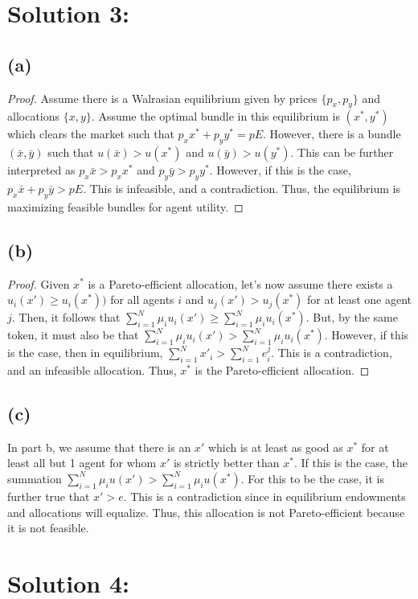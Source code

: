 \documentclass[10pt,a4paper]{article}
\begin{document}
\section*{Solution 3:}
  \subsection*{(a)}
    \begin{proof}
      Assume there is a Walrasian equilibrium given by prices $\{p_x,p_y\}$ and allocations $\{x,y\}$. Assume the optimal bundle in this equilibrium is $(x^*,y^*)$ which clears the market such that $p_xx^* + p_yy^* = pE$. However, there is a bundle $(\bar{x},\bar{y})$ such that $u(\bar{x})>u(x^*)$ and $u(\bar{y}) > u(y^*)$. This can be further interpreted as $p_x\bar{x} > p_xx^*$ and $p_y\bar{y} > p_yy^*$. However, if this is the case, $p_x\bar{x}+p_y\bar{y}>pE$. This is infeasible, and a contradiction. Thus, the equilibrium is maximizing feasible bundles for agent utility. 
    \end{proof}
  \subsection*{(b)}
    \begin{proof}
      Given $x^*$ is a Pareto-efficient allocation, let's now assume there exists a $u_i(x')\geq u_i(x^*))$ for all agents $i$ and $u_j(x')>u_j(x^*)$ for at least one agent $j$. Then, it follows that $\sum\limits_{i=1}^N\mu_iu_i(x')\geq\sum\limits_{i=1}^N\mu_iu_i(x^*)$. But, by the same token, it must also be that $\sum\limits_{i=1}^N\mu_iu_i(x')>\sum\limits_{i=1}^N\mu_iu_i(x^*)$. However, if this is the case, then in equilibrium, $\sum\limits_{i=1}^Nx'_i>\sum\limits_{i=1}^Ne_i^j$. This is a contradiction, and an infeasible allocation. Thus, $x^*$ is the Pareto-efficient allocation. 
    \end{proof}
  \subsection*{(c)}
    In part b, we assume that there is an $x'$  which is at least as good as $x^*$ for at least all but 1 agent for whom $x'$ is strictly better than $x^*$. If this is the case, the summation $\sum\limits_{i=1}^N\mu_iu(x')>\sum\limits_{i=1}^N\mu_iu(x^*)$. For this to be the case, it is further true that $x'>e$. This is a contradiction since in equilibrium endowments and allocations will equalize. Thus, this allocation is not Pareto-efficient because it is not feasible.
  \section*{Solution 4:}
\end{document}

